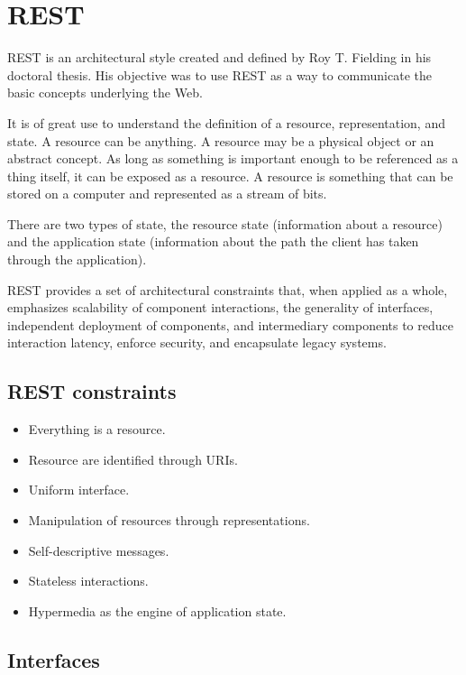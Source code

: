 \documentclass[conference]{IEEEtran}
\begin{document}
\section{REST}
\label{sec:rest}

REST is an architectural style created and defined by Roy T. Fielding in his doctoral thesis. His objective was to use REST as a way to communicate the basic concepts underlying the Web. 

It is of great use to understand the definition of a resource, representation, and state. A resource can be anything. A resource may be a physical object or an abstract concept. As long as something is important enough to be referenced as a thing itself, it can be exposed as a resource. A resource is something that can be stored on a computer and represented as a stream of bits. 

There are two types of state, the resource state (information about a resource) and the application state (information about the path the client has taken through the application).

REST provides a set of architectural constraints that, when applied as a whole, emphasizes scalability of component interactions, the generality of interfaces, independent deployment of components, and intermediary components to reduce interaction latency, enforce security, and encapsulate legacy systems.

\subsection{REST constraints}

\begin{itemize}
  \item Everything is a resource.
  \item Resource are identified through URIs.
  \item Uniform interface.
  \item Manipulation of resources through representations.
  \item Self-descriptive messages.
  \item Stateless interactions.
  \item Hypermedia as the engine of application state.
\end{itemize}

\subsection{Interfaces}
\end{document}
